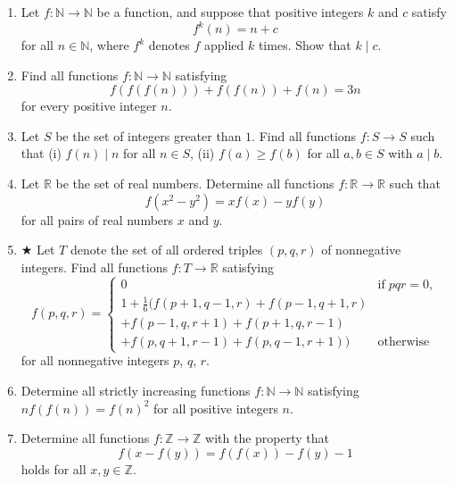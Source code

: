 \begin{enumerate}
    


    \item Let $f: \mathbb{N} \to \mathbb{N}$ be a function, and suppose that positive integers $k$ and $c$ satisfy
    \[f^k(n) = n + c\]for all $n \in \mathbb{N}$, where $f^k$ denotes $f$ applied $k$ times. Show that $k \mid c$.

    


    \item Find all functions $f: \mathbb{N} \to \mathbb{N}$ satisfying
    \[f(f(f(n))) + f(f(n)) + f(n) = 3n\]for every positive integer $n$.

    


    \item Let $S$ be the set of integers greater than $1$. Find all functions $f: S \to S$ such that
    (i) $f(n) \mid n$ for all $n \in S$,
    (ii) $f(a) \ge f(b)$ for all $a, b \in S$ with $a \mid b$.

    


    \item Let $\mathbb{R}$ be the set of real numbers. Determine all functions $f: \mathbb{R} \to \mathbb{R}$ such that \[f(x^2 - y^2) = x f(x) - y f(y)\]for all pairs of real numbers $x$ and $y$.

    


    \item $ \bigstar $ Let $T$ denote the set of all ordered triples $(p,q,r)$ of nonnegative integers. Find all functions $f: T \to \mathbb{R}$ satisfying
    \[f(p,q,r) = \begin{cases} 0 & \text{if} \; pqr = 0, \\ 1 + \frac{1}{6}(f(p + 1,q - 1,r) + f(p - 1,q + 1,r) & \\ + f(p - 1,q,r + 1) + f(p + 1,q,r - 1) & \\ + f(p,q + 1,r - 1) + f(p,q - 1,r + 1)) & \text{otherwise} \end{cases} \]for all nonnegative integers $p$, $q$, $r$.

    


    \item Determine all strictly increasing functions $f: \mathbb{N} \to \mathbb{N}$ satisfying $nf(f(n)) = f(n)^2$ for all positive integers $n$.

    


    \item Determine all functions $f: \mathbb{Z} \rightarrow \mathbb{Z}$ with the property that
    \[f(x - f(y)) = f(f(x)) - f(y) - 1\]holds for all $x,y \in \mathbb{Z}$.


\end{enumerate}
